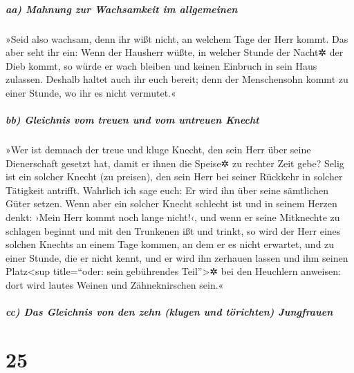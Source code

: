 \hypertarget{aa-mahnung-zur-wachsamkeit-im-allgemeinen}{%
\subparagraph{aa) Mahnung zur Wachsamkeit im
allgemeinen}\label{aa-mahnung-zur-wachsamkeit-im-allgemeinen}}

 »Seid also wachsam, denn ihr wißt nicht, an welchem Tage
der Herr kommt.  Das aber seht ihr ein: Wenn der Hausherr
wüßte, in welcher Stunde der Nacht✲ der Dieb kommt, so würde er wach
bleiben und keinen Einbruch in sein Haus zulassen. 
Deshalb haltet auch ihr euch bereit; denn der Menschensohn kommt zu
einer Stunde, wo ihr es nicht vermutet.«

\hypertarget{bb-gleichnis-vom-treuen-und-vom-untreuen-knecht}{%
\subparagraph{bb) Gleichnis vom treuen und vom untreuen
Knecht}\label{bb-gleichnis-vom-treuen-und-vom-untreuen-knecht}}

 »Wer ist demnach der treue und kluge Knecht, den sein
Herr über seine Dienerschaft gesetzt hat, damit er ihnen die Speise✲ zu
rechter Zeit gebe?  Selig ist ein solcher Knecht (zu
preisen), den sein Herr bei seiner Rückkehr in solcher Tätigkeit
antrifft.  Wahrlich ich sage euch: Er wird ihn über seine
sämtlichen Güter setzen.  Wenn aber ein solcher Knecht
schlecht ist und in seinem Herzen denkt: ›Mein Herr kommt noch lange
nicht!‹,  und wenn er seine Mitknechte zu schlagen
beginnt und mit den Trunkenen ißt und trinkt,  so wird
der Herr eines solchen Knechts an einem Tage kommen, an dem er es nicht
erwartet, und zu einer Stunde, die er nicht kennt,  und
er wird ihn zerhauen lassen und ihm seinen Platz\textless sup
title=``oder: sein gebührendes Teil''\textgreater✲ bei den Heuchlern
anweisen: dort wird lautes Weinen und Zähneknirschen sein.«

\hypertarget{cc-das-gleichnis-von-den-zehn-klugen-und-tuxf6richten-jungfrauen}{%
\subparagraph{cc) Das Gleichnis von den zehn (klugen und törichten)
Jungfrauen}\label{cc-das-gleichnis-von-den-zehn-klugen-und-tuxf6richten-jungfrauen}}

\hypertarget{section-24}{%
\section{25}\label{section-24}}

